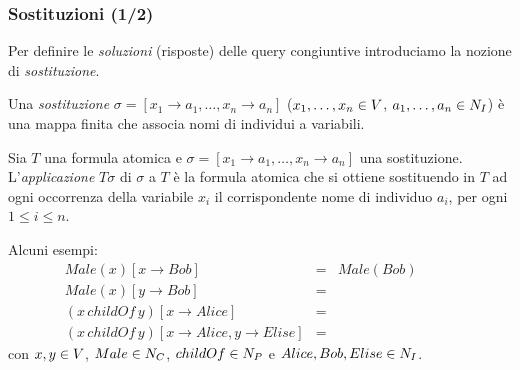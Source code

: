 \documentclass[8pt]{beamer}
\begin{document}
\begin{frame}
\frametitle{Sostituzioni (1/2)}

Per definire le \emph{soluzioni} (risposte) delle query congiuntive introduciamo la
nozione di \emph{sostituzione}.
\vspace{\baselineskip}

Una \emph{sostituzione} $\sigma=[x_1 \rightarrow a_1, \ldots, x_n \rightarrow a_n]$
($x_1, \ldots, x_n \in V$, $a_1, \ldots, a_n \in N_I$)
\`e una mappa finita che associa nomi di individui a variabili.
\vspace{\baselineskip}

Sia $T$ una formula atomica e $\sigma=[x_1 \rightarrow a_1, \ldots, x_n \rightarrow a_n]$
una sostituzione. L'\emph{applicazione} $T\sigma$ di $\sigma$ a $T$ \`e la formula atomica 
che si ottiene sostituendo in $T$ ad ogni occorrenza della variabile $x_i$ il
corrispondente nome di individuo $a_i$, per ogni $1\leq i\leq n$.
\vspace{\baselineskip}

Alcuni esempi:
\[
 \begin{array}{lcl}
  Male(x)[x \rightarrow Bob] & = & Male(Bob) \\
  Male(x)[y \rightarrow Bob] & = & \phantom{Male(x)} \\
  (x\,childOf\,y)[x \rightarrow Alice] & = & \phantom{Alice\,childOf\,y} \\
  (x\,childOf\,y)[x \rightarrow Alice, y \rightarrow Elise] & = & \phantom{Alice\,childOf\,Elise}
 \end{array}
\]
con $x,y \in V$, $Male \in N_C$, $childOf \in N_P$ e $Alice, Bob, Elise \in N_I$.
\end{frame}
\end{document}
